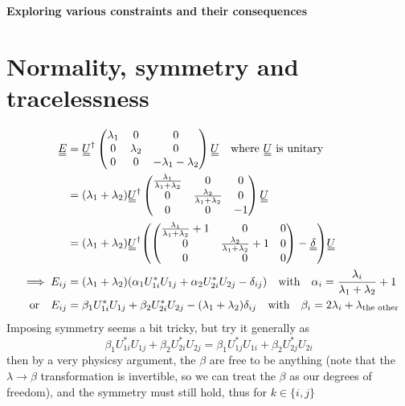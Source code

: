 \documentclass[11pt]{article}
\begin{document}
\begin{center}
    \LARGE
    \textbf{Exploring various constraints and their consequences}
\end{center}
\vspace{1em}
\section{Normality, symmetry and tracelessness}\label{sec:nosytr}
\begin{align}
    \du{E} &= \du{U}^\dagger \begin{pmatrix}
        \lambda_1 & 0 & 0 \\
        0 & \lambda_2 & 0 \\
        0 & 0 & - \lambda_1 - \lambda_2
    \end{pmatrix} \du{U} \qq{where $\du{U}$ is unitary} \\
    &= (\lambda_1+\lambda_2)\du{U}^\dagger \begin{pmatrix}
        \frac{\lambda_1}{\lambda_1+\lambda_2} & 0 & 0 \\
        0 & \frac{\lambda_2}{\lambda_1+\lambda_2} & 0 \\
        0 & 0 & -1
    \end{pmatrix} \du{U} \\
    &= (\lambda_1+\lambda_2)\du{U}^\dagger \qty(\begin{pmatrix}
        \frac{\lambda_1}{\lambda_1+\lambda_2}+1 & 0 & 0 \\
        0 & \frac{\lambda_2}{\lambda_1+\lambda_2}+1 & 0 \\
        0 & 0 & 0
    \end{pmatrix} - \du{\delta}) \du{U} \\
    \implies E_{ij} &= (\lambda_1+\lambda_2)\qty(\alpha_1 U_{1i}^*U_{1j} + \alpha_2 U_{2i}^*U_{2j} - \delta_{ij}) \qq{with} \alpha_i = \frac{\lambda_i}{\lambda_1+\lambda_2} + 1 \\
    \qq{or} E_{ij} &= \beta_1 U_{1i}^*U_{1j} + \beta_2 U_{2i}^*U_{2j} - (\lambda_1+\lambda_2)\delta_{ij} \qq{with} \beta_i = 2\lambda_i + \lambda_\text{the other}
\end{align}
Imposing symmetry seems a bit tricky, but try it generally as
\begin{equation}
    \beta_1 U_{1i}^*U_{1j} + \beta_2 U_{2i}^*U_{2j} = \beta_1 U_{1j}^*U_{1i} + \beta_2 U_{2j}^*U_{2i}
\end{equation}
then by a very physicsy argument, the $\beta$ are free to be anything (note that the $\lambda \rightarrow \beta$ transformation is invertible, so we can treat the $\beta$ as our degrees of freedom), and the symmetry must still hold, thus for $k\in\{i,j\}$
\end{document}
